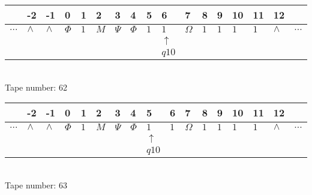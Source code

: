 \documentclass{article}
\begin{document}
\begin{table}[H]
\centering
\begin{tabular}{lllllllllllllllll}
 & -2 & -1 & 0 & 1 & 2 & 3 & 4 & 5 & 6 & 7 & 8 & 9 & 10 & 11 & 12 & \\
\hline
$...$ & \multicolumn{1}{|l|}{$\wedge$} & \multicolumn{1}{|l|}{$\wedge$} & \multicolumn{1}{|l|}{$\Phi$} & \multicolumn{1}{|l|}{$1$} & \multicolumn{1}{|l|}{$M$} & \multicolumn{1}{|l|}{$\Psi$} & \multicolumn{1}{|l|}{$\Phi$} & \multicolumn{1}{|l|}{$1$} & \multicolumn{1}{|l|}{$1$} & \multicolumn{1}{|l|}{$\Omega$} & \multicolumn{1}{|l|}{$1$} & \multicolumn{1}{|l|}{$1$} & \multicolumn{1}{|l|}{$1$} & \multicolumn{1}{|l|}{$1$} & \multicolumn{1}{|l|}{$\wedge$} & $...$\\
\hline
&  &  &  &  &  &  &  &  & $\uparrow$ &  &  &  &  &  &  &  \\
&  &  &  &  &  &  &  &  & $ q10 $ &  &  &  &  &  &  &  \\
\end{tabular}
\\
Tape number: 62
\noindent\makebox[\linewidth]{\hdashrule{\textwidth}{1pt}{1pt}}\end{table}

\begin{table}[H]
\centering
\begin{tabular}{lllllllllllllllll}
 & -2 & -1 & 0 & 1 & 2 & 3 & 4 & 5 & 6 & 7 & 8 & 9 & 10 & 11 & 12 & \\
\hline
$...$ & \multicolumn{1}{|l|}{$\wedge$} & \multicolumn{1}{|l|}{$\wedge$} & \multicolumn{1}{|l|}{$\Phi$} & \multicolumn{1}{|l|}{$1$} & \multicolumn{1}{|l|}{$M$} & \multicolumn{1}{|l|}{$\Psi$} & \multicolumn{1}{|l|}{$\Phi$} & \multicolumn{1}{|l|}{$1$} & \multicolumn{1}{|l|}{$1$} & \multicolumn{1}{|l|}{$\Omega$} & \multicolumn{1}{|l|}{$1$} & \multicolumn{1}{|l|}{$1$} & \multicolumn{1}{|l|}{$1$} & \multicolumn{1}{|l|}{$1$} & \multicolumn{1}{|l|}{$\wedge$} & $...$\\
\hline
&  &  &  &  &  &  &  & $\uparrow$ &  &  &  &  &  &  &  &  \\
&  &  &  &  &  &  &  & $ q10 $ &  &  &  &  &  &  &  &  \\
\end{tabular}
\\
Tape number: 63
\noindent\makebox[\linewidth]{\hdashrule{\textwidth}{1pt}{1pt}}\end{table}
\end{document}
